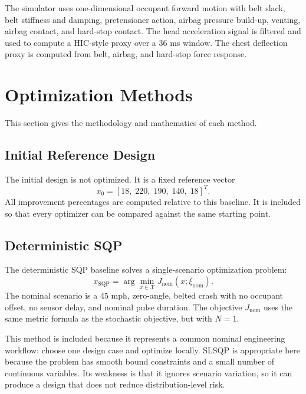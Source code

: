 \documentclass[conference]{IEEEtran}
\begin{document}
The simulator uses one-dimensional occupant forward motion with belt slack, belt stiffness and damping, pretensioner action, airbag pressure build-up, venting, airbag contact, and hard-stop contact. The head acceleration signal is filtered and used to compute a HIC-style proxy over a 36 ms window. The chest deflection proxy is computed from belt, airbag, and hard-stop force response.

\section{Optimization Methods}
This section gives the methodology and mathematics of each method.

\subsection{Initial Reference Design}
The initial design is not optimized. It is a fixed reference vector
\begin{equation}
x_0=[18,\;220,\;190,\;140,\;18]^T.
\end{equation}
All improvement percentages are computed relative to this baseline. It is included so that every optimizer can be compared against the same starting point.

\subsection{Deterministic SQP}
The deterministic SQP baseline solves a single-scenario optimization problem:
\begin{equation}
x_{\mathrm{SQP}}=\arg\min_{x\in\mathcal{X}}J_{\mathrm{nom}}(x;\xi_{\mathrm{nom}}).
\end{equation}
The nominal scenario is a 45 mph, zero-angle, belted crash with no occupant offset, no sensor delay, and nominal pulse duration. The objective $J_{\mathrm{nom}}$ uses the same metric formula as the stochastic objective, but with $N=1$.

This method is included because it represents a common nominal engineering workflow: choose one design case and optimize locally. SLSQP is appropriate here because the problem has smooth bound constraints and a small number of continuous variables. Its weakness is that it ignores scenario variation, so it can produce a design that does not reduce distribution-level risk.
\end{document}
